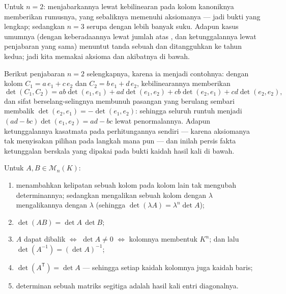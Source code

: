 \begin{remark}
Untuk $n = 2$: menjabarkannya lewat kebilinearan pada kolom kanoniknya memberikan
rumusnya, yang sebaliknya memenuhi aksiomanya --- jadi bukti yang
lengkap; sedangkan $n = 3$ serupa dengan lebih banyak suku. Adapun kasus umumnya
(dengan keberadaannya lewat jumlah atas , dan ketunggalannya lewat penjabaran
yang sama) menuntut tanda sebuah  dan ditangguhkan ke
tahun kedua; jadi kita  memakai aksioma dan akibatnya
di bawah.

Berikut penjabaran $n = 2$ selengkapnya, karena ia menjadi contohnya: dengan
kolom $C_1 = a\,e_1 + c\,e_2$ dan $C_2 = b\,e_1 + d\,e_2$,
kebilinearannya memberikan
\[
\det(C_1, C_2) = ab\det(e_1, e_1) + ad\det(e_1, e_2)
+ cb\det(e_2, e_1) + cd\det(e_2, e_2),
\]
dan sifat berselang-selingnya membunuh pasangan yang berulang sembari membalik
$\det(e_2, e_1) = -\det(e_1, e_2)$: sehingga seluruh  runtuh menjadi
$(ad - bc)\det(e_1, e_2) = ad - bc$ lewat penormalannya. Adapun ketunggalannya
kasatmata pada perhitungannya sendiri --- karena aksiomanya tak menyisakan
pilihan pada langkah mana pun --- dan inilah persis fakta ketunggalan
berskala yang dipakai pada bukti kaidah hasil kali di bawah.
\end{remark}

\begin{theorem}[Sifat]\label{thm:b1:det:props}
Untuk $A, B \in \mathcal{M}_n(K)$:
\begin{enumerate}
  \item menambahkan kelipatan sebuah kolom pada kolom lain tak mengubah
        determinannya; sedangkan mengalikan sebuah kolom dengan $\lambda$ mengalikannya
        dengan $\lambda$ (sehingga $\det(\lambda A) = \lambda^n \det A$);
  \item $\det(AB) = \det A\, \det B$;
  \item $A$ dapat dibalik $\iff$ $\det A \neq 0$ $\iff$ kolomnya
        membentuk  $K^n$; dan lalu $\det(A^{-1}) = (\det
        A)^{-1}$;
  \item $\det(A^{\mathsf T}) = \det A$ --- sehingga setiap kaidah kolomnya
        juga kaidah baris;
  \item determinan sebuah matriks segitiga adalah hasil kali entri
        diagonalnya.
\end{enumerate}
\end{theorem}

